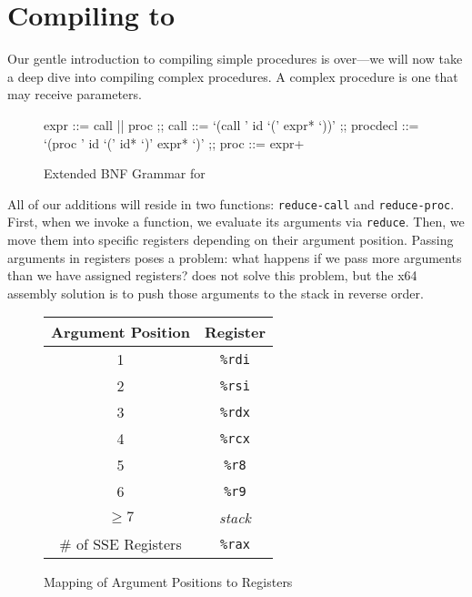 \section{Compiling  to }
Our gentle introduction to compiling simple procedures is over---we will now take a deep dive into compiling complex procedures. A complex procedure is one that may receive parameters.

\begin{figure}[H]
    \begin{tcolorbox}
        \begin{bnfgrammar}[lllll]
            expr ::= call || proc
            ;;
            call ::= `(call ' id `(' expr* `))'
            ;;
            procdecl ::= `(proc ' id `(' id* `)' expr* `)'
            ;;
            proc ::= expr+
        \end{bnfgrammar}
    \end{tcolorbox}
    \caption{ Extended BNF Grammar for  }
\end{figure}

All of our additions will reside in two functions: \texttt{reduce-call} and \texttt{reduce-proc}. First, when we invoke a function, we evaluate its arguments via \texttt{reduce}. Then, we move them into specific registers depending on their argument position. Passing arguments in registers poses a problem: what happens if we pass more arguments than we have assigned registers?  does not solve this problem, but the x64 assembly solution is to push those arguments to the stack in reverse order.

\begin{figure}[H]
    \begin{center}
        \begin{tabular}{c|c}
            Argument Position & Register\\
            \hline
            1 & \texttt{\%rdi} \\
            2 & \texttt{\%rsi} \\ 
            3 & \texttt{\%rdx} \\
            4 & \texttt{\%rcx} \\
            5 & \texttt{\%r8} \\
            6 & \texttt{\%r9} \\
            $\geq 7$ & \textit{stack} \\
            \# of SSE Registers & \texttt{\%rax}
        \end{tabular}
    \end{center}
    \caption{Mapping of Argument Positions to Registers}
    \label{fig:argument-registers}
\end{figure} 

